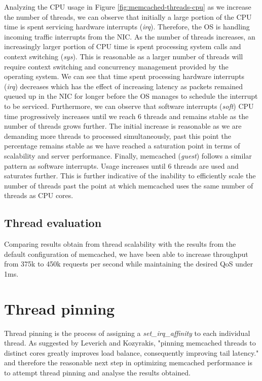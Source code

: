 Analyzing the CPU usage in Figure \ref{fig:memcached-threads-cpu} as we increase the number of threads, we can observe that initially a large portion of the CPU time is spent servicing hardware interrupts (\textit{irq}). Therefore, the OS is handling incoming traffic interrupts from the NIC. As the number of threads increases, an increasingly larger portion of CPU time is spent processing system calls and context switching (\textit{sys}). This is reasonable as a larger number of threads will require context switching and concurrency management provided by the operating system. We can see that time spent processing hardware interrupts (\textit{irq}) decreases which has the effect of increasing latency as packets remained queued up in the NIC for longer before the OS manages to schedule the interrupt to be serviced. Furthermore, we can observe that software interrupts (\textit{soft}) CPU time progressively increases until we reach 6 threads and remains stable as the number of threads grows further. The initial increase is reasonable as we are demanding more threads to processed simultaneously, past this point the percentage remains stable as we have reached a saturation point in terms of scalability and server performance. Finally, memcached (\textit{guest}) follows a similar pattern as software interrupts. Usage increases until 6 threads are used and saturates further. This is further indicative of the inability to efficiently scale the number of threads past the point at which memcached uses the same number of threads as CPU cores.

\subsection{Thread evaluation}
Comparing results obtain from thread scalability with the results from the default configuration of memcached, we have been able to increase throughput from 375k to 450k requests per second while maintaining the desired QoS under 1ms.



\section{Thread pinning}
\label{sec:thread-pinning}
Thread pinning is the process of assigning a \textit{set\_irq\_affinity} to each individual thread. As suggested by Leverich and Kozyrakis, "pinning memcached threads to distinct cores greatly improves load balance, consequently improving tail latency." \cite{leverich2014reconciling} and therefore the reasonable next step in optimizing memcached performance is to attempt thread pinning and analyse the results obtained.

